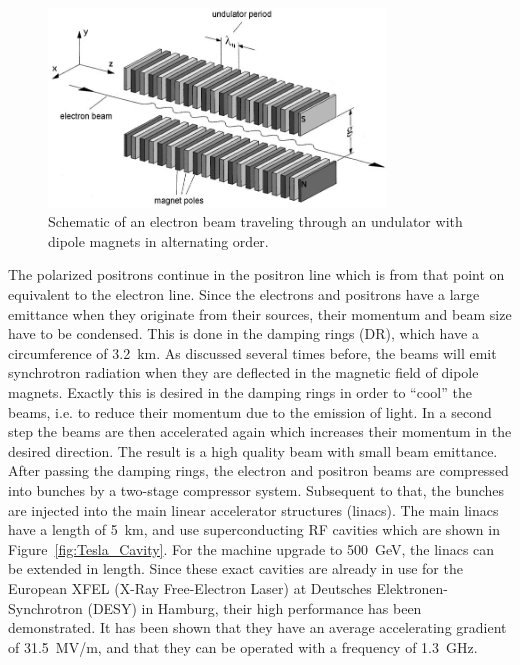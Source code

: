 \begin{figure}
\centering
\includegraphics[width=0.8\textwidth]{Figures/Undulator_edited.png}
\caption[Schematic layout of an undulator]{Schematic of an electron beam traveling through an undulator with dipole magnets in alternating order.~\cite[cf. p. 41]{Wille}}
\label{fig:Undulator}
\end{figure}
The polarized positrons continue in the positron line which is from that point on equivalent to the electron line.
Since the electrons and positrons have a large emittance when they originate from their sources, their momentum and beam size have to be condensed.
This is done in the damping rings (DR), which have a circumference of \SI{3.2}{\kilo\meter}.
As discussed several times before, the beams will emit synchrotron radiation when they are deflected in the magnetic field of dipole magnets.
Exactly this is desired in the damping rings in order to ``cool'' the beams, i.e. to reduce their momentum due to the emission of light.
In a second step the beams are then accelerated again which increases their momentum in the desired direction.
The result is a high quality beam with small beam emittance.\\
After passing the damping rings, the electron and positron beams are compressed into bunches by a two-stage compressor system.
Subsequent to that, the bunches are injected into the main linear accelerator structures (linacs).
The main linacs have a length of \SI{5}{\kilo\meter}, and use superconducting RF cavities which are shown in Figure~\ref{fig:Tesla_Cavity}. 
For the machine upgrade to \SI{500}{\GeV}, the linacs can be extended in length.
Since these exact cavities are already in use for the European XFEL (X-Ray Free-Electron Laser) at Deutsches Elektronen-Synchrotron (DESY) in Hamburg, their high performance has been demonstrated.
It has been shown that they have an average accelerating gradient of \SI{31.5}{MV/m}, and that they can be operated with a frequency of \SI{1.3}{\giga\hertz}.\\
